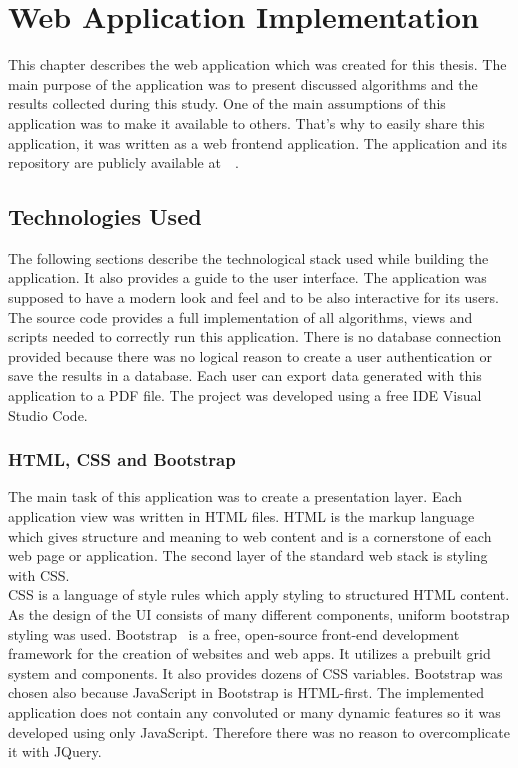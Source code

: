 \chapter{Web Application Implementation}%
This chapter describes the web application which was created for this thesis. The main purpose of the application was to present discussed algorithms
and the results collected during this study. One of the main assumptions of this application was to make it available to others. That's why to
easily share this application, it was written as a web frontend application. The application and its repository are publicly available at~\cite{26}~\cite{27}.
\section{Technologies Used}
The following sections describe the technological stack used while building the application. It also provides a guide to the user interface. The application 
was supposed to have a modern look and feel and to be also interactive for its users. The source code\cite{27} provides a full implementation of all algorithms,
views and scripts needed to correctly run this application. There is no database connection provided because there was no logical reason to create a user
authentication or save the results in a database. Each user can export data generated with this application to a PDF file. The project was developed using a free
IDE Visual Studio Code.
\subsection{HTML, CSS and Bootstrap}
The main task of this application was to create a presentation layer. Each application view was written in HTML files. HTML is the markup language which
gives structure and meaning to web content and is a cornerstone of each web page or application. The second layer of the standard web stack is styling with CSS.\\
CSS is a language of style rules which apply styling to structured HTML content. As the design of the UI consists of many different components, uniform
bootstrap styling was used. Bootstrap~\cite{28} is a free, open-source front-end development framework for the creation of websites and web apps. It utilizes a prebuilt
grid system and components. It also provides dozens of CSS variables. Bootstrap was chosen also because JavaScript in Bootstrap is HTML-first. The implemented 
application does not contain any convoluted or many dynamic features so it was developed using only JavaScript. Therefore there was no reason to overcomplicate it
with JQuery.
